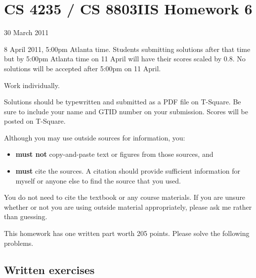 \documentclass[letterpaper]{article}
\title{}
\date{}
\begin{document}
\thispagestyle{empty}

\section*{CS 4235 / CS 8803IIS Homework 6}

 30 March 2011

 8 April 2011, 5:00pm Atlanta time. Students submitting solutions after that time but by 5:00pm Atlanta time on 11 April will have their scores scaled by 0.8. No solutions will be accepted after 5:00pm on 11 April.

 Work individually.

\bigskip\noindent
Solutions should be typewritten and submitted as a PDF file on T-Square. Be sure to include your name and GTID number on your submission. Scores will be posted on T-Square.

\bigskip\noindent
Although you may use outside sources for information, you:
\begin{itemize}
\item {\bf must not} copy-and-paste text or figures from those sources, and
\item {\bf must} cite the sources. A citation should provide sufficient information for myself or anyone else to find the source that you used.
\end{itemize}
You do not need to cite the textbook or any course materials. If you are unsure whether or not you are using outside material appropriately, please ask me rather than guessing.

This homework has one written part worth 205 points. Please solve the following problems.

\subsection*{Written exercises}
\end{document}
